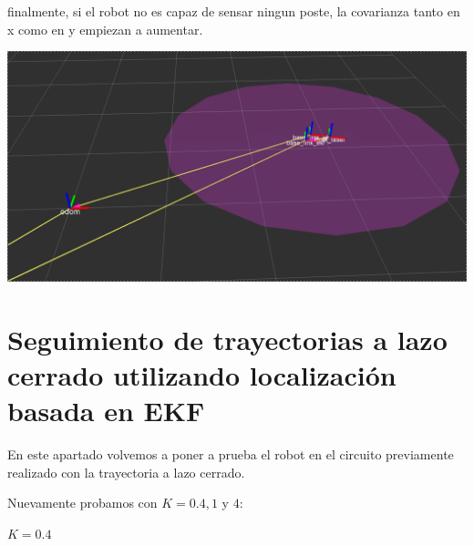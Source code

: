 finalmente, si el robot no es capaz de sensar ningun poste, la covarianza tanto en x como en y empiezan a aumentar.

\includegraphics[scale=0.3]{punto4/ekfSinVerNingunPoste.png}


\section{Seguimiento de trayectorias a lazo cerrado utilizando localización basada en EKF}

En este apartado volvemos a poner a prueba el robot en el circuito previamente realizado con la trayectoria a lazo cerrado.

Nuevamente probamos con $K= 0.4,1$ y $4$:

$K=0.4$







